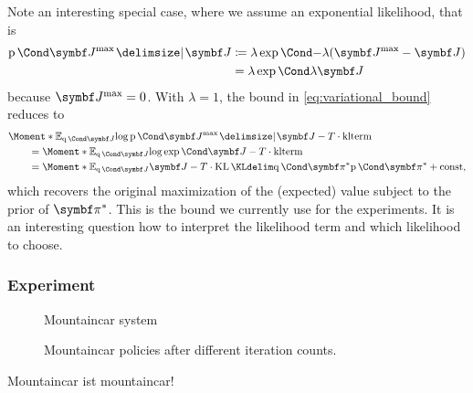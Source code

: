 Note an interesting special case, where we assume an exponential likelihood, that is
\begin{align}
    \begin{split}
        \Prob{\mat{J}^\text{max} \given \mat{J}}
        &\coloneqq \lambda \Fun{\exp}{-\lambda (\mat{J}^\text{max} - \mat{J})} \\
        &= \lambda \Fun{\exp}{\lambda \mat{J}}
    \end{split}
\end{align}
because $\mat{J}^\text{max} = 0$.
With $\lambda = 1$, the bound in \cref{eq:variational_bound} reduces to
\begin{align}
    \begin{split}
        \MoveEqLeft\Moment*{\E_{\Variat{\mat{J}}}}{\log \Prob{\mat{J}^{\text{max}} \given \mat{J}}} - T \cdot \text{klterm}
        \\
        &= \Moment*{\E_{\Variat{\mat{J}}}}{\log \Fun{\exp}{\mat{J}}} - T \cdot \text{klterm}
        \\
        &= \Moment*{\E_{\Variat{\mat{J}}}}{\mat{J}} - T \cdot \KL{\Variat{\mat{\pi}^\ast}}{\Prob{\mat{\pi}^\ast}} + \text{const},
    \end{split}
\end{align}
which recovers the original maximization of the (expected) value subject to the prior of $\mat{\pi}^\ast$.
This is the bound we currently use for the experiments.
It is an interesting question how to interpret the likelihood term and which likelihood to choose.


\subsubsection{Experiment}
\begin{figure}[t]
    \centering
    
    \caption{
        \label{fig:mountaincar:system}
        Mountaincar system
    }
\end{figure}
\begin{figure}[tp]
    \centering
    
    
    
    \caption{
        \label{fig:mountaincar:policy}
        Mountaincar policies after different iteration counts.
    }
\end{figure}
Mountaincar ist mountaincar!

